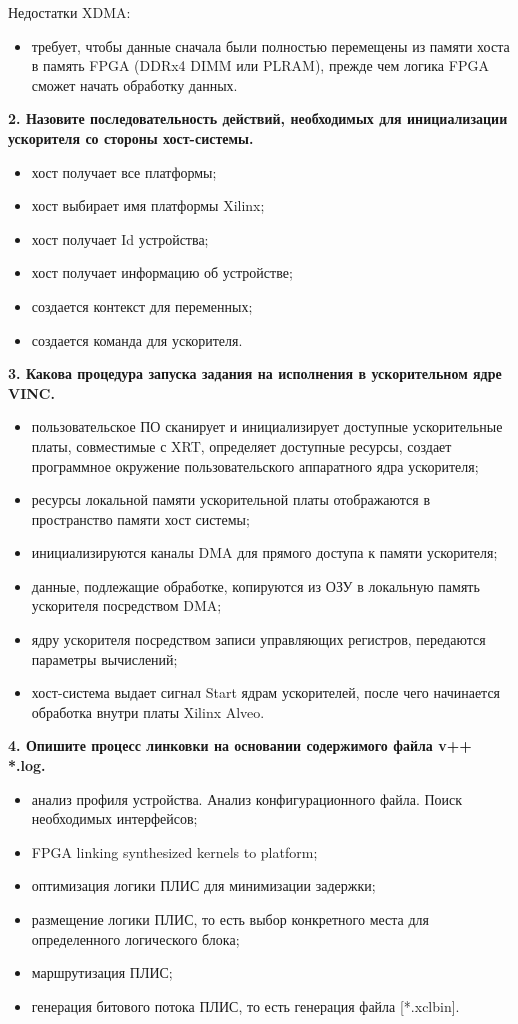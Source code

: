 Недостатки XDMA:
\begin{itemize}
	\item требует, чтобы данные сначала были полностью перемещены из памяти хоста в память FPGA (DDRx4 DIMM или PLRAM), прежде чем логика FPGA сможет начать обработку данных.
\end{itemize}

\textbf{2. Назовите последовательность действий, необходимых для инициализации ускорителя со стороны хост-системы.}

\begin{itemize}
	\item хост получает все платформы;
 	\item хост выбирает имя платформы Xilinx;
	\item хост получает Id устройства;
	\item хост получает информацию об устройстве;
	\item создается контекст для переменных;
	\item создается команда для ускорителя.
\end{itemize}

\textbf{3. Какова процедура запуска задания на исполнения в ускорительном ядре VINC.}

\begin{itemize}
	\item пользовательское ПО сканирует и инициализирует доступные ускорительные платы, совместимые с XRT, определяет доступные ресурсы, создает программное окружение пользовательского аппаратного ядра ускорителя;
 	\item ресурсы локальной памяти ускорительной платы отображаются в пространство памяти хост системы;
	\item инициализируются каналы DMA для прямого доступа к памяти ускорителя;
	\item данные, подлежащие обработке, копируются из ОЗУ в локальную память ускорителя посредством DMA;
	\item ядру ускорителя посредством записи управляющих
регистров, передаются параметры вычислений;
	\item хост-система выдает сигнал Start ядрам ускорителей, после чего начинается обработка внутри платы Xilinx Alveo.
\end{itemize}

\textbf{4. Опишите процесс линковки на основании содержимого файла v++ *.log.}

\begin{itemize}
	\item анализ профиля устройства. Анализ конфигурационного файла. Поиск необходимых интерфейсов;
	\item FPGA linking synthesized kernels to platform;
	\item оптимизация логики ПЛИС для минимизации задержки;
	\item размещение логики ПЛИС, то есть выбор конкретного места для определенного логического блока;
	\item маршрутизация ПЛИС;
	\item генерация битового потока ПЛИС, то есть
генерация файла [*.xclbin].
\end{itemize}
